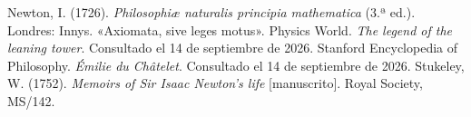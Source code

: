 \documentclass[11pt]{article}
\begin{document}
\begin{referencias}
 Newton, I. (1726). \emph{Philosophiæ naturalis principia mathematica}
  (3.ª ed.). Londres: Innys. «Axiomata, sive leges motus».
 Physics World. \emph{The legend of the leaning tower}. Consultado el 14
  de septiembre de 2026.
 Stanford Encyclopedia of Philosophy. \emph{Émilie du Châtelet}.
  Consultado el 14 de septiembre de 2026.
 Stukeley, W. (1752). \emph{Memoirs of Sir Isaac Newton's life}
  [manuscrito]. Royal Society, MS/142.
\end{referencias}
\end{document}
